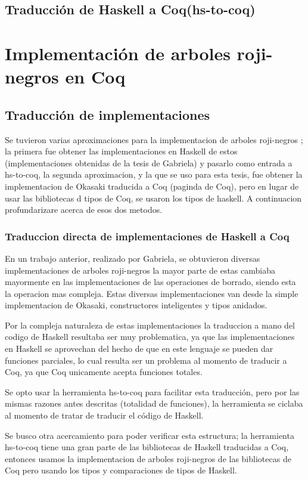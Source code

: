 \documentclass[letterpaper,12pt,oneside]{book}
\newcommand{\coq}{\textbf{Coq}}
\newcommand{\arns}{arboles roji-negros }
\begin{document}
\section{Traducción de Haskell a \coq (hs-to-coq)}

\chapter{Implementación de arboles roji-negros en \coq}

\section{Traducción de implementaciones}
Se tuvieron varias aproximaciones para la implementacion de \arns; la primera fue obtener las implementaciones en
Haskell de estos (implementaciones obtenidas de la tesis de Gabriela) y pasarlo como entrada a hs-to-coq, la 
segunda aproximacion, y la que se uso para esta tesis, fue obtener la implementacion de Okasaki traducida a Coq 
(paginda de Coq), pero en lugar de usar las bibliotecas d tipos de Coq, se usaron los tipos de haskell.
A continuacion profundarizare acerca de esos dos metodos.
\subsection{Traduccion directa de implementaciones de Haskell a Coq}
En un trabajo anterior, realizado por Gabriela, se obtuvieron diversas implementaciones de \arns la mayor parte de estas
cambiaba mayormente en las implementaciones de las operaciones de borrado, siendo esta la operacion mas compleja. 
Estas diversas implementaciones van desde la simple implementacion de Okasaki, constructores inteligentes y tipos anidados.

Por la compleja naturaleza de estas implementaciones la traduccion a mano del codigo de Haskell resultaba ser muy problematica,
ya que las implementaciones en Haskell se aprovechan del hecho de que en este lenguaje se pueden dar funciones parciales, 
lo cual resulta ser un problema al momento de traducir a Coq, ya que Coq unicamente acepta funciones totales.

Se opto usar la herramienta hs-to-coq para facilitar esta traducci\'on, pero por las mismas razones antes descritas (totalidad de funciones),
la herramienta se ciclaba al momento de tratar de traducir el c\'odigo de Haskell. 

Se busco otra acercamiento para poder verificar esta estructura; la herramienta hs-to-coq tiene una gran parte de las bibliotecas de Haskell 
traducidas a Coq, entonces usamos la implementacion de \arns de las bibliotecas de Coq pero usando los tipos y comparaciones de tipos de Haskell.
\end{document}

